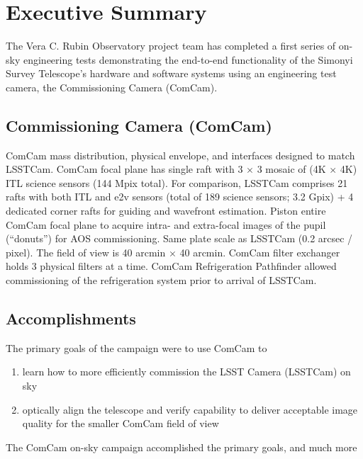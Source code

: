 \section{Executive Summary}
\label{sec:summary}

The Vera C. Rubin Observatory project team has completed a first series of on-sky engineering tests demonstrating the end-to-end functionality of the Simonyi Survey Telescope's hardware and software systems using an engineering test camera, the Commissioning Camera (ComCam).

\subsection{Commissioning Camera (ComCam)}

ComCam mass distribution, physical envelope, and interfaces designed to match LSSTCam.
ComCam focal plane has single raft with 3 $\times$ 3 mosaic of (4K $\times$ 4K) ITL science sensors (144 Mpix total).
For comparison, LSSTCam comprises 21 rafts with both ITL and e2v sensors (total of 189 science sensors; 3.2 Gpix) + 4 dedicated corner rafts for guiding and wavefront estimation.
Piston entire ComCam focal plane to acquire intra- and extra-focal images of the pupil (``donuts'') for AOS commissioning.
Same plate scale as LSSTCam (0.2 arcsec / pixel).
The field of view is 40 arcmin $\times$ 40 arcmin.
ComCam filter exchanger holds 3 physical filters at a time.
ComCam Refrigeration Pathfinder allowed commissioning of the refrigeration system prior to arrival of LSSTCam.

\subsection{Accomplishments}

The primary goals of the campaign were to use ComCam to

\begin{enumerate}
    \item learn how to more efficiently commission the LSST Camera (LSSTCam) on sky
    \item optically align the telescope and verify capability to deliver acceptable image quality for the smaller ComCam field of view
\end{enumerate}

The ComCam on-sky campaign accomplished the primary goals, and much more

